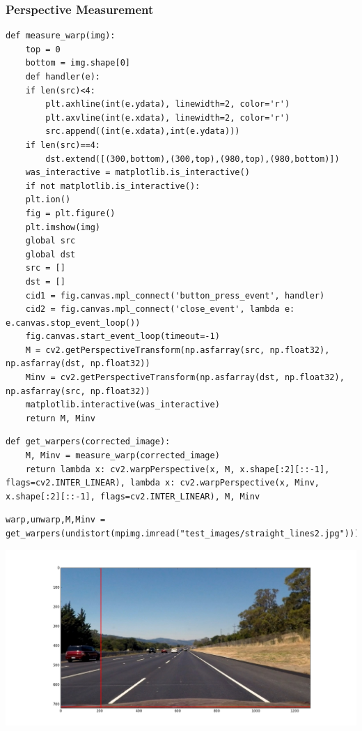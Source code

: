 \documentclass[11pt]{article}
\begin{document}
\subsubsection*{Perspective Measurement}
\label{sec-2-2-3}

\begin{verbatim}
def measure_warp(img):
    top = 0
    bottom = img.shape[0]
    def handler(e):
	if len(src)<4:
	    plt.axhline(int(e.ydata), linewidth=2, color='r')
	    plt.axvline(int(e.xdata), linewidth=2, color='r')
	    src.append((int(e.xdata),int(e.ydata)))
	if len(src)==4:
	    dst.extend([(300,bottom),(300,top),(980,top),(980,bottom)])
    was_interactive = matplotlib.is_interactive()
    if not matplotlib.is_interactive():
	plt.ion()
    fig = plt.figure()
    plt.imshow(img)
    global src
    global dst
    src = []
    dst = []
    cid1 = fig.canvas.mpl_connect('button_press_event', handler)
    cid2 = fig.canvas.mpl_connect('close_event', lambda e: e.canvas.stop_event_loop())
    fig.canvas.start_event_loop(timeout=-1)
    M = cv2.getPerspectiveTransform(np.asfarray(src, np.float32), np.asfarray(dst, np.float32))
    Minv = cv2.getPerspectiveTransform(np.asfarray(dst, np.float32), np.asfarray(src, np.float32))
    matplotlib.interactive(was_interactive)
    return M, Minv
\end{verbatim}

\begin{verbatim}
def get_warpers(corrected_image):
    M, Minv = measure_warp(corrected_image)
    return lambda x: cv2.warpPerspective(x, M, x.shape[:2][::-1], flags=cv2.INTER_LINEAR), lambda x: cv2.warpPerspective(x, Minv, x.shape[:2][::-1], flags=cv2.INTER_LINEAR), M, Minv
\end{verbatim}

\begin{verbatim}
warp,unwarp,M,Minv = get_warpers(undistort(mpimg.imread("test_images/straight_lines2.jpg")))
\end{verbatim}

\includegraphics[width=.9\linewidth]{output_images/figure_3-1.png}
\end{document}
